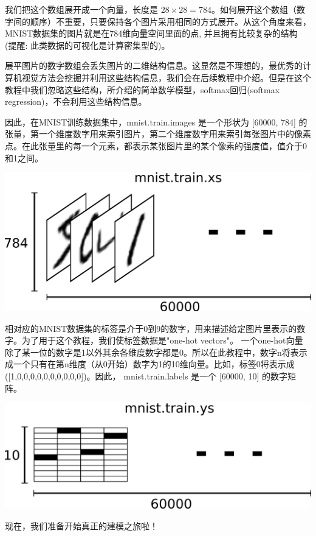 \documentclass[a4paper,11pt,twoside]{ctexbook}
\begin{document}
我们把这个数组展开成一个向量，长度是 $ 28 \times 28 = 784$。如何展开这个数组（数字间的顺序）不重要，只要保持各个图片采用相同的方式展开。从这个角度来看，MNIST数据集的图片就是在784维向量空间里面的点, 并且拥有比较复杂的结构 (提醒: 此类数据的可视化是计算密集型的)。

展平图片的数字数组会丢失图片的二维结构信息。这显然是不理想的，最优秀的计算机视觉方法会挖掘并利用这些结构信息，我们会在后续教程中介绍。但是在这个教程中我们忽略这些结构，所介绍的简单数学模型，softmax回归(softmax regression)，不会利用这些结构信息。

因此，在MNIST训练数据集中，mnist.train.images 是一个形状为 [60000, 784] 的张量，第一个维度数字用来索引图片，第二个维度数字用来索引每张图片中的像素点。在此张量里的每一个元素，都表示某张图片里的某个像素的强度值，值介于0和1之间。

\begin{center}
\includegraphics[width=.75\textwidth]{../SOURCE/images/mnist-train-xs.png}
\end{center}

相对应的MNIST数据集的标签是介于0到9的数字，用来描述给定图片里表示的数字。为了用于这个教程，我们使标签数据是"one-hot vectors"。 一个one-hot向量除了某一位的数字是1以外其余各维度数字都是0。所以在此教程中，数字n将表示成一个只有在第n维度（从0开始）数字为1的10维向量。比如，标签0将表示成([1,0,0,0,0,0,0,0,0,0,0])。因此， mnist.train.labels 是一个 [60000, 10] 的数字矩阵。

\begin{center}
\includegraphics[width=.75\textwidth]{../SOURCE/images/mnist-train-ys.png}
\end{center}

现在，我们准备开始真正的建模之旅啦！
\end{document}
